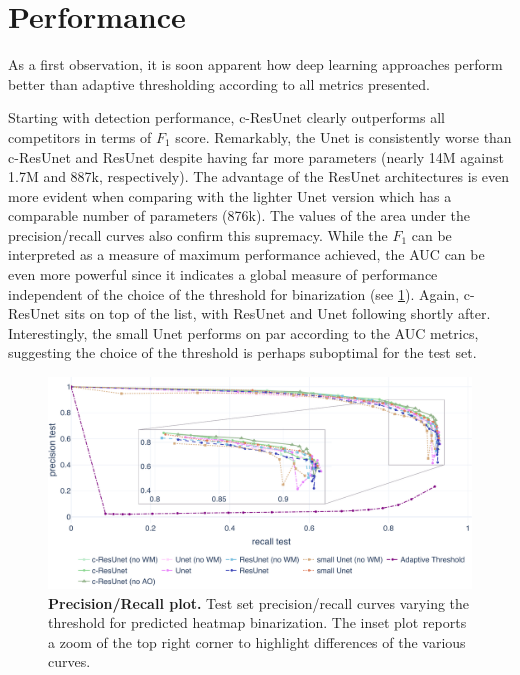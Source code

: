 \section{Performance}

As a first observation, it is soon apparent how deep learning approaches perform better than adaptive thresholding according to all metrics presented.

Starting with detection performance,
c-ResUnet clearly outperforms all competitors in terms of $F_1$ score.
Remarkably, the Unet is consistently worse than c-ResUnet and ResUnet despite having far more parameters (nearly 14M against 1.7M and 887k, respectively).
The advantage of the ResUnet architectures is even more evident when comparing with the lighter Unet version which has a comparable number of parameters (876k).
The values of the area under the precision/recall curves also confirm this supremacy. While the $F_1$ can be interpreted as a measure of maximum performance achieved, the AUC can be even more powerful since it indicates a global measure of performance independent of the choice of the threshold for binarization (see \cref{fig:results:PR}). Again, c-ResUnet sits on top of the list, with ResUnet and Unet following shortly after. Interestingly, the small Unet performs on par according to the AUC metrics, suggesting the choice of the threshold is perhaps suboptimal for the test set.
\begin{figure}
    \centering
    \includegraphics[width=\textwidth]{figures/140_results/PR_test.pdf}
    \caption{\textbf{Precision/Recall plot.} 
    Test set precision/recall curves varying the threshold for predicted heatmap binarization. The inset plot reports a zoom of the top right corner to highlight differences of the various curves.}
    \label{fig:results:PR}
\end{figure}

